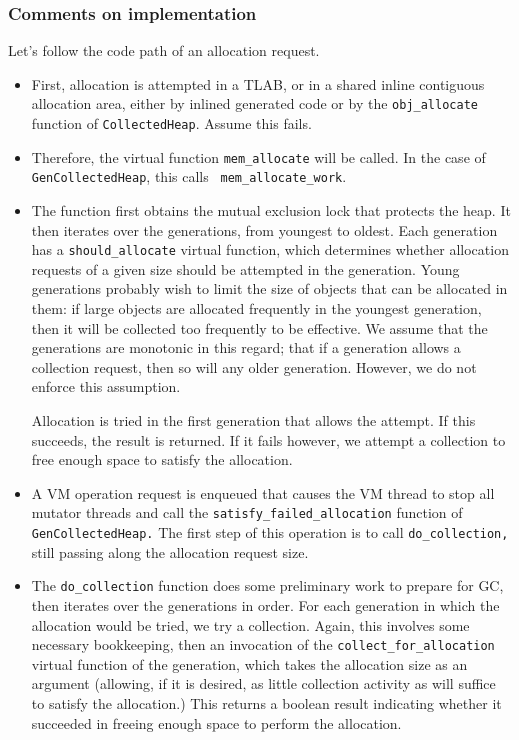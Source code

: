 \documentclass{article}
\begin{document}
\subsubsection{Comments on implementation}
\label{gch:impl}

Let's follow the code path of an allocation request.
\begin{itemize}
\item First, allocation is attempted in a TLAB, or in a shared inline
contiguous allocation area, either by inlined generated code or by the
{\tt obj\_allocate} function of {\tt CollectedHeap}.  Assume this fails.

\item Therefore, the virtual function {\tt mem\_allocate} will be
called.  In the case of {\tt GenCollectedHeap}, this calls {\tt
mem\_allocate\_work}.

\item The function first obtains the mutual exclusion lock that
protects the heap.  It then iterates over the generations, from
youngest to oldest.  Each generation has a {\tt should\_allocate}
virtual function, which determines whether allocation requests of a
given size should be attempted in the generation.  Young generations
probably wish to limit the size of objects that can be allocated in
them: if large objects are allocated frequently in the youngest
generation, then it will be collected too frequently to be effective. 
We assume that the generations are monotonic in this regard; that if a
generation allows a collection request, then so will any older
generation.  However, we do not enforce this assumption.

Allocation is tried in the first generation that allows the attempt.
If this succeeds, the result is returned.  If it fails however, we
attempt a collection to free enough space to satisfy the allocation.

\item A VM operation request is enqueued that causes the VM thread to
stop all mutator threads and call the {\tt satisfy\_failed\_allocation}
function of {\tt GenCollectedHeap.}  The first step of this operation
is to call {\tt do\_collection,} still passing along the allocation
request size.

\item The {\tt do\_collection} function does some preliminary work to
prepare for GC, then iterates over the generations in order.  For each
generation in which the allocation would be tried, we try a
collection.  Again, this involves some necessary bookkeeping, then an
invocation of the {\tt collect\_for\_allocation} virtual function of the
generation, which takes the allocation size as an argument (allowing,
if it is desired, as little collection activity as will suffice
to satisfy the allocation.)  This returns a boolean result indicating
whether it succeeded in freeing enough space to perform the
allocation.


\end{itemize}
\end{document}
